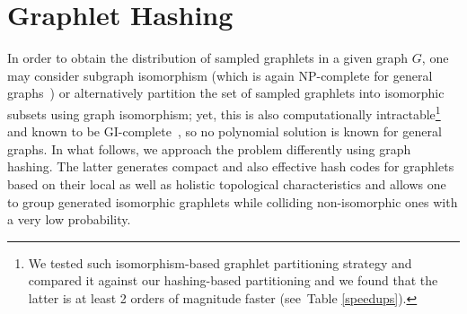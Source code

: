 \documentclass[journal]{IEEEtran}
\theoremstyle{definition}
\newcommand{\tab}[1]{Table \ref{#1}}
\begin{document}
\section{Graphlet Hashing}
\label{sec:hash-fns}

In order to obtain the distribution of sampled graphlets in a given graph $G$, one may consider subgraph isomorphism (which is again NP-complete for general graphs~\cite{Mehlhorn1984}) or alternatively partition the set of sampled graphlets into isomorphic subsets using graph isomorphism; yet, this is also computationally intractable\footnote{We tested such isomorphism-based graphlet partitioning strategy and compared it against our hashing-based partitioning and we found that the latter is at least 2 orders of magnitude faster (see~\tab{speedups}).} and known to be GI-complete~\cite{Kobler1994}, so no polynomial solution is known for general graphs. In what follows, we approach the problem differently using graph hashing. The latter generates compact and also effective hash codes for graphlets based on their local as well as holistic topological characteristics and allows one to group generated isomorphic graphlets while colliding non-isomorphic ones with a very low probability.
\end{document}
